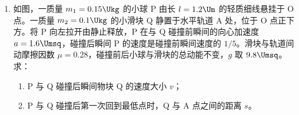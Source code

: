 \documentclass[\gkver]{gaokaozhenti}
\begin{document}
\begin{enumerate}
{$= 0.1\times 9.8\times 0.5 + \frac{\sqrt{3}}{3}\times 0.1\times 9.8\times\frac{\sqrt{3}}{2} + 0.1\times 5$

$= 1.48 \UN$

（2）$0.4 \Us$ 后匀速，有

$F - mg\sin 30^{\circ} - \mu mg\cos 30^{\circ} - F_{\text{安}} = 0$

$F - mg\sin 30^{\circ} - \mu mg\cos 30^{\circ} - BIL = 0$

$F - mg\sin 30^{\circ} - \mu mg\cos 30^{\circ} - \frac{B^{2}L^{2}v}{R} = 0$

$\frac{B^{2}L^{2}v}{R} = 0.5$，解得 $L = 0.5 \Um$

（3）线框只有在穿过磁场区域的过程中才会产生热量，其电流强度

$I = \frac{BLv}{R} = \frac{0.5 \times 0.5 \times 2}{0.25} \UA = 2 \UA$

用时

$t = \frac{2D}{v} = \frac{2 \times 0.4}{2} \Us = 0.4 \Us$

产生的焦耳热

$Q = I^{2}Rt = 2^{2}\times 0.25\times 0.4 \UJ = 0.4 \UJ$

（使用 $Q = W_{\text{安克}}$ 亦可）

撤去外力后线框做匀减速直线运动，当速度降为零时，由于

$mg\sin 30^{\circ} = \mu mg\cos 30^{\circ}$

所以不会下滑。
}

\item
如图，一质量 $m_{1} = 0.15 \Ukg$ 的小球 P 由长 $l = 1.2 \Um$ 的轻质细线悬挂于 O 点。一质量 $m_{2} = 0.1 \Ukg$ 的小滑块 Q 静置于水平轨道 A 处，位于 O 点正下方。将 P 向左拉开由静止释放，P 在与 Q 碰撞前瞬间的向心加速度 $a = 1.6 \Umsq$，碰撞后瞬间 P 的速度是碰撞前瞬间速度的 $1/5$。滑块与轨道间动摩擦因数 $\mu = 0.28$，碰撞前后小球与滑块的总动能不变，$g$ 取 $9.8 \Umsq$。求：
\begin{enumerate}
	\item
	P 与 Q 碰撞后瞬间物块 Q 的速度大小 $v$；
	\item
	P 与 Q 碰撞后第一次回到最低点时，Q 与 A 点之间的距离 $s$。
\end{enumerate}
\onepicture[align=right, w=3.87cm]{}
\end{enumerate}
\end{document}
